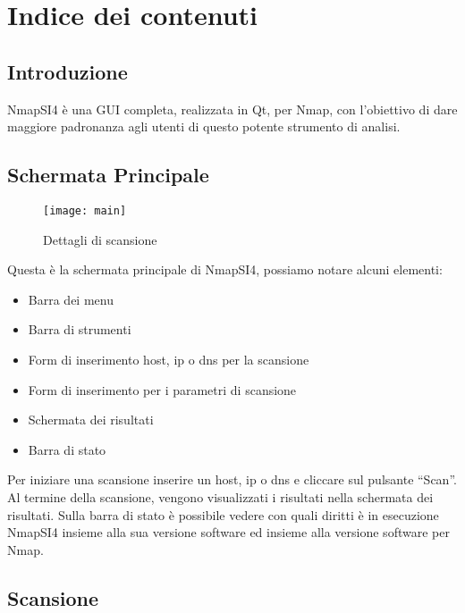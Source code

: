 
\chapter{Indice dei contenuti}
\label{ch:Contents}

\section{Introduzione}
\label{sec:ContentsIntro}

NmapSI4 \`e una GUI completa, realizzata in Qt, per Nmap, con l'obiettivo di 
dare maggiore padronanza agli utenti di questo potente strumento di analisi.

\section{Schermata Principale}
\label{sec:ContentsMain}

\begin{figure}[h]
  \centering
  \texttt{[image: main]}
  \caption{Dettagli di scansione}
  \label{fig:ContentsMainScanDetails}
\end{figure}
Questa \`e la schermata principale di NmapSI4, possiamo notare alcuni elementi:
\begin{itemize}
\item Barra dei menu
\item Barra di strumenti
\item Form di inserimento host, ip o dns per la scansione
\item Form di inserimento per i parametri di scansione
\item Schermata dei risultati
\item Barra di stato
\end{itemize}
Per iniziare una scansione inserire un host, ip o dns e cliccare sul pulsante 
``Scan''. Al termine della scansione, vengono visualizzati i risultati nella 
schermata dei risultati. Sulla barra di stato \`e possibile vedere con quali 
diritti \`e in esecuzione NmapSI4 insieme alla sua versione software ed 
insieme alla versione software per Nmap.

\section{Scansione}
\label{sec:ContentsScan}

